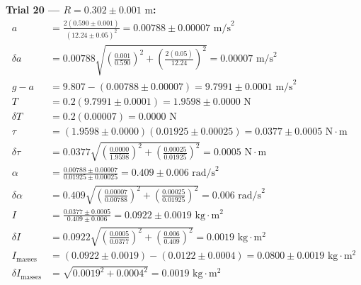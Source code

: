 \documentclass[11pt]{article}
\begin{document}
\textbf{Trial 20 — $R = 0.302 \pm 0.001\text{ m}$:}
\begin{align*}
a &= \frac{2(0.590 \pm 0.001)}{(12.24 \pm 0.05)^2} = 0.00788 \pm 0.00007\text{ m/s}^2 \\
\delta a &= 0.00788\sqrt{\left(\frac{0.001}{0.590}\right)^2 + \left(\frac{2(0.05)}{12.24}\right)^2} = 0.00007\text{ m/s}^2 \\
g - a &= 9.807 - (0.00788 \pm 0.00007) = 9.7991 \pm 0.0001\text{ m/s}^2 \\
T &= 0.2(9.7991 \pm 0.0001) = 1.9598 \pm 0.0000\text{ N} \\
\delta T &= 0.2(0.00007) = 0.0000\text{ N} \\
\tau &= (1.9598 \pm 0.0000)(0.01925 \pm 0.00025) = 0.0377 \pm 0.0005\text{ N}\cdot\text{m} \\
\delta\tau &= 0.0377\sqrt{\left(\frac{0.0000}{1.9598}\right)^2 + \left(\frac{0.00025}{0.01925}\right)^2} = 0.0005\text{ N}\cdot\text{m} \\
\alpha &= \frac{0.00788 \pm 0.00007}{0.01925 \pm 0.00025} = 0.409 \pm 0.006\text{ rad/s}^2 \\
\delta\alpha &= 0.409\sqrt{\left(\frac{0.00007}{0.00788}\right)^2 + \left(\frac{0.00025}{0.01925}\right)^2} = 0.006\text{ rad/s}^2 \\
I &= \frac{0.0377 \pm 0.0005}{0.409 \pm 0.006} = 0.0922 \pm 0.0019\text{ kg}\cdot\text{m}^2 \\
\delta I &= 0.0922\sqrt{\left(\frac{0.0005}{0.0377}\right)^2 + \left(\frac{0.006}{0.409}\right)^2} = 0.0019\text{ kg}\cdot\text{m}^2 \\
I_{\text{masses}} &= (0.0922 \pm 0.0019) - (0.0122 \pm 0.0004) = 0.0800 \pm 0.0019\text{ kg}\cdot\text{m}^2 \\
\delta I_{\text{masses}} &= \sqrt{0.0019^2 + 0.0004^2} = 0.0019\text{ kg}\cdot\text{m}^2
\end{align*}
\end{document}
